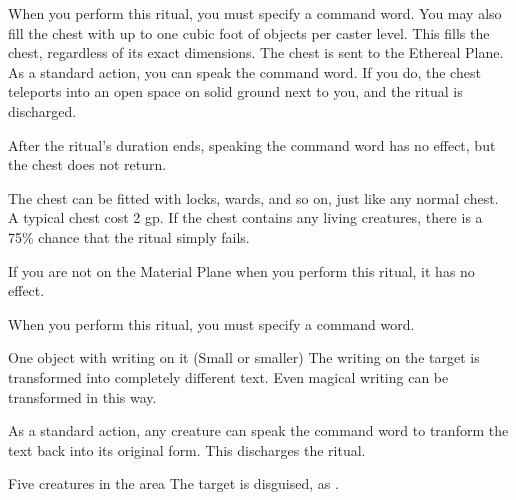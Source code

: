 \spellspecial When you perform this ritual, you must specify a command word. You may also fill the chest with up to one cubic foot of objects per caster level. This fills the chest, regardless of its exact dimensions.
\spellline
\spelleffect The chest is sent to the Ethereal Plane. As a standard action, you can speak the command word. If you do, the chest teleports into an open space on solid ground next to you, and the ritual is discharged.

After the ritual's duration ends, speaking the command word has no effect, but the chest does not return.

\spellnotes The chest can be fitted with locks, wards, and so on, just like any normal chest. A typical chest cost 2 gp. If the chest contains any living creatures, there is a 75\% chance that the ritual simply fails.

If you are not on the Material Plane when you perform this ritual, it has no effect.

\spellspecial When you perform this ritual, you must specify a command word.
\spellline
\begin{spelltarget}{One object with writing on it (Small or smaller)}
    \spelleffect The writing on the target is transformed into completely different text. Even magical writing can be transformed in this way.

    As a standard action, any creature can speak the command word to tranform the text back into its original form. This discharges the ritual.
\end{spelltarget}

\spelldur{\durlong \dismissable}
\begin{spelltarget}{Five creatures in the area}
    \spelleffect The target is disguised, as .
\end{spelltarget}

